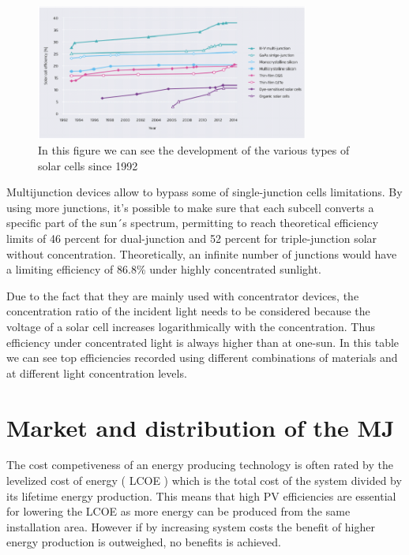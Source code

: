 \documentclass[11pt]{article} %
\begin{document}
\begin{figure}[h]
	\centering
	\includegraphics[width=0.8\textwidth]{img/Immagine.png}
	\caption{In this figure we can see the development of the various types of solar cells since 1992}
\end{figure}

Multijunction devices allow to bypass some of single-junction cells limitations. By using more junctions, it's possible to make sure that each subcell converts a specific part of the sun´s spectrum, permitting to reach theoretical efficiency limits of 46 percent for dual-junction and 52 percent for triple-junction solar without concentration. Theoretically, an infinite number of junctions would have a limiting efficiency of 86.8\% under highly concentrated sunlight.

Due to the fact that they are mainly used with concentrator devices, the concentration ratio of the incident light needs to be considered because the voltage of a solar cell increases logarithmically with the  concentration. Thus efficiency  under  concentrated  light is  always  higher  than  at one-sun. In this table we can see top efficiencies  recorded using different combinations of materials and at different light concentration levels.

\section{Market and distribution of the MJ}

The cost competiveness of an energy producing technology is often rated by the levelized cost of energy ( LCOE )  which is  the  total  cost  of  the  system  divided  by  its  lifetime  energy production. This means that high PV efficiencies  are  essential  for lowering  the  LCOE  as  more  energy can  be produced from the same installation area. However if by increasing system costs the  benefit  of  higher  energy  production is outweighed, no benefits is achieved.   
\end{document}
